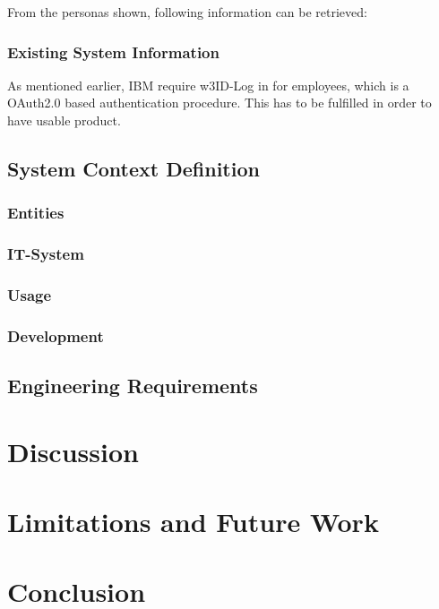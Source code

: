 From the personas shown, following information can be retrieved:

\begin{closeItem}
    \item []
\end{closeItem}

\subsection{Existing System Information}
As mentioned earlier, IBM require w3ID-Log in for employees, which is a OAuth2.0 \parencite[cf.][]{InternetEngineeringTaskForce.2012} based authentication procedure. This has to be fulfilled in order to have  usable product. 
\begin{closeItem}
    \item []
\end{closeItem}
\paragraph{}

\section{System Context Definition}
\subsection{Entities}

\subsection{IT-System}

\subsection{Usage}

\subsection{Development}


\section{Engineering Requirements}


\chapter{Discussion}


\chapter{Limitations and Future Work}


\chapter{Conclusion}